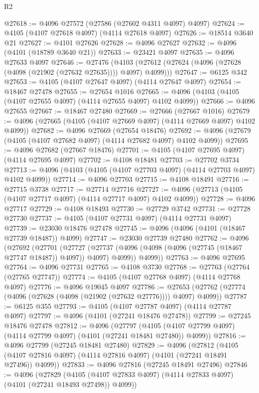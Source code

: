\begin{lexlean}{R2}
\begin{coremodule}
@27618 := @4096 @27572 (@27586 (@27602 @4311 @4097) @4097)
@27624 := @4105 (@4107 @27618 @4097) (@4114 @27618 @4097)
@27626 := @18514 @3640 @21
@27627 := @4101 @27626
@27628 := @4096 @27627
@27632 := @4096 (@4101 (@18789 @3640 @21))
@27633 := @23421 @4097
@27635 := @4096 @27633 @4097
@27646 := @27476
    (@4103 (@27612 (@27624 (@4096 (@27628 (@4098 (@21902 (@27632 @27635)))) @4097) @4099)))
@27647 := @6125 @342
@27653 := @4105 (@4107 @27647 @4097) (@4114 @27647 @4097)
@27654 := @18467 @27478
@27655 := @27654 @1016
@27665 := @4096 (@4103 (@4105 (@4107 @27655 @4097) (@4114 @27655 @4097) @4102 @4099))
@27666 := @4096 @27655
@27667 := @18467 @27480
@27669 := @27666 (@27667 @1016)
@27679 := @4096 (@27665 (@4105 (@4107 @27669 @4097) (@4114 @27669 @4097) @4102 @4099))
@27682 := @4096 @27669 (@27654 @18476)
@27692 := @4096 (@27679 (@4105 (@4107 @27682 @4097) (@4114 @27682 @4097) @4102 @4099))
@27695 := @4096 @27682 (@27667 @18476)
@27701 := @4105 (@4107 @27695 @4097) (@4114 @27695 @4097)
@27702 := @4108 @18481
@27703 := @27702 @3734
@27713 := @4096 (@4103 (@4105 (@4107 @27703 @4097) (@4114 @27703 @4097) @4102 @4099))
@27714 := @4096 @27703
@27715 := @4108 @18491
@27716 := @27715 @3738
@27717 := @27714 @27716
@27727 := @4096 (@27713 (@4105 (@4107 @27717 @4097) (@4114 @27717 @4097) @4102 @4099))
@27728 := @4096 @27717
@27729 := @4108 @18493
@27730 := @27729 @3742
@27731 := @27728 @27730
@27737 := @4105 (@4107 @27731 @4097) (@4114 @27731 @4097)
@27739 := @23030 @18476 @27478
@27745 := @4096 (@4096 (@4101 (@18467 @27739 @18487)) @4099)
@27747 := @23030 @27739 @27480
@27762 := @4096
    (@27692
      (@27701
        (@27727 (@27737 (@4096 (@4098 (@4096 (@27745 (@18467 @27747 @18487)) @4097)) @4097) @4099))
        @4099))
@27763 := @4096 @27695
@27764 := @4096 @27731
@27765 := @4108 @3730
@27768 := @27763 (@27764 (@27765 @27747))
@27774 := @4105 (@4107 @27768 @4097) (@4114 @27768 @4097)
@27776 := @4096 @19045 @4097
@27786 := @27653 (@27762 (@27774 (@4096 (@27628 (@4098 (@21902 (@27632 @27776)))) @4097) @4099))
@27787 := @6125 @355
@27793 := @4105 (@4107 @27787 @4097) (@4114 @27787 @4097)
@27797 := @4096 (@4101 (@27241 @18476 @27478))
@27799 := @27245 @18476 @27478
@27812 := @4096
    (@27797 (@4105 (@4107 @27799 @4097) (@4114 @27799 @4097) (@4101 (@27241 @18481 @27480)) @4099))
@27816 := @4096 @27799 (@27245 @18481 @27480)
@27829 := @4096
    (@27812 (@4105 (@4107 @27816 @4097) (@4114 @27816 @4097) (@4101 (@27241 @18491 @27496)) @4099))
@27833 := @4096 @27816 (@27245 @18491 @27496)
@27846 := @4096
    (@27829 (@4105 (@4107 @27833 @4097) (@4114 @27833 @4097) (@4101 (@27241 @18493 @27498)) @4099))

\end{coremodule}
\end{lexlean}
